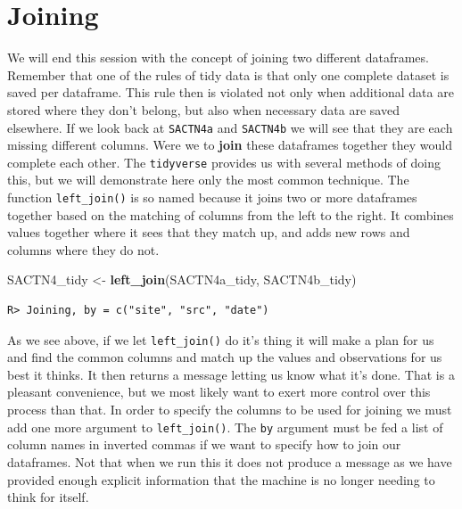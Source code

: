 \documentclass[]{book}
\newenvironment{Shaded}{\begin{snugshade}}{\end{snugshade}}
\newcommand{\KeywordTok}[1]{\textcolor[rgb]{0.13,0.29,0.53}{\textbf{#1}}}
\newcommand{\DataTypeTok}[1]{\textcolor[rgb]{0.13,0.29,0.53}{#1}}
\newcommand{\StringTok}[1]{\textcolor[rgb]{0.31,0.60,0.02}{#1}}
\newcommand{\OperatorTok}[1]{\textcolor[rgb]{0.81,0.36,0.00}{\textbf{#1}}}
\newcommand{\NormalTok}[1]{#1}
\theoremstyle{definition}
\theoremstyle{definition}
\theoremstyle{definition}
\theoremstyle{remark}
\begin{document}
\begin{Shaded}
\end{Shaded}

\section{Joining}\label{joining}

We will end this session with the concept of joining two different
dataframes. Remember that one of the rules of tidy data is that only one
complete dataset is saved per dataframe. This rule then is violated not
only when additional data are stored where they don't belong, but also
when necessary data are saved elsewhere. If we look back at
\texttt{SACTN4a} and \texttt{SACTN4b} we will see that they are each
missing different columns. Were we to \textbf{join} these dataframes
together they would complete each other. The \texttt{tidyverse} provides
us with several methods of doing this, but we will demonstrate here only
the most common technique. The function \texttt{left\_join()} is so
named because it joins two or more dataframes together based on the
matching of columns from the left to the right. It combines values
together where it sees that they match up, and adds new rows and columns
where they do not.

\begin{Shaded}
\begin{Highlighting}[]
\NormalTok{SACTN4_tidy <-}\StringTok{ }\KeywordTok{left_join}\NormalTok{(SACTN4a_tidy, SACTN4b_tidy)}
\end{Highlighting}
\end{Shaded}

\begin{verbatim}
R> Joining, by = c("site", "src", "date")
\end{verbatim}

As we see above, if we let \texttt{left\_join()} do it's thing it will
make a plan for us and find the common columns and match up the values
and observations for us best it thinks. It then returns a message
letting us know what it's done. That is a pleasant convenience, but we
most likely want to exert more control over this process than that. In
order to specify the columns to be used for joining we must add one more
argument to \texttt{left\_join()}. The \texttt{by} argument must be fed
a list of column names in inverted commas if we want to specify how to
join our dataframes. Not that when we run this it does not produce a
message as we have provided enough explicit information that the machine
is no longer needing to think for itself.
\end{document}

